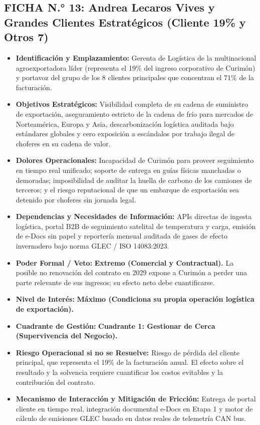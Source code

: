 \subsection*{FICHA N.° 13: Andrea Lecaros Vives y Grandes Clientes Estratégicos (Cliente 19\% y Otros 7)}
\begin{itemize}
\item \textbf{Identificación y Emplazamiento:} Gerenta de Logística de la multinacional agroexportadora líder (representa el 19\% del ingreso corporativo de Curimón) y portavoz del grupo de los 8 clientes principales que concentran el 71\% de la facturación.
\item \textbf{Objetivos Estratégicos:} Visibilidad completa de su cadena de suministro de exportación, aseguramiento estricto de la cadena de frío para mercados de Norteamérica, Europa y Asia, descarbonización logística auditada bajo estándares globales y cero exposición a escándalos por trabajo ilegal de choferes en su cadena de valor.
\item \textbf{Dolores Operacionales:} Incapacidad de Curimón para proveer seguimiento en tiempo real unificado; soporte de entrega en guías físicas manchadas o demoradas; imposibilidad de auditar la huella de carbono de los camiones de terceros; y el riesgo reputacional de que un embarque de exportación sea detenido por choferes sin jornada legal.
\item \textbf{Dependencias y Necesidades de Información:} APIs directas de ingesta logística, portal B2B de seguimiento satelital de temperatura y carga, emisión de e-Docs sin papel y reportería mensual auditada de gases de efecto invernadero bajo norma GLEC / ISO 14083:2023.
\item \textbf{Poder Formal / Veto:} \textbf{Extremo (Comercial y Contractual).} La posible no renovación del contrato en 2029 expone a Curimón a perder una parte relevante de sus ingresos; su efecto neto debe cuantificarse.
\item \textbf{Nivel de Interés:} \textbf{Máximo (Condiciona su propia operación logística de exportación).}
\item \textbf{Cuadrante de Gestión:} \textbf{Cuadrante 1: Gestionar de Cerca (Supervivencia del Negocio).}
\item \textbf{Riesgo Operacional si no se Resuelve:} Riesgo de pérdida del cliente principal, que representa el 19\% de la facturación anual. El efecto sobre el resultado y la solvencia requiere cuantificar los costos evitables y la contribución del contrato.
\item \textbf{Mecanismo de Interacción y Mitigación de Fricción:} Entrega de portal cliente en tiempo real, integración documental e-Docs en Etapa 1 y motor de cálculo de emisiones GLEC basado en datos reales de telemetría CAN bus.
\end{itemize}

